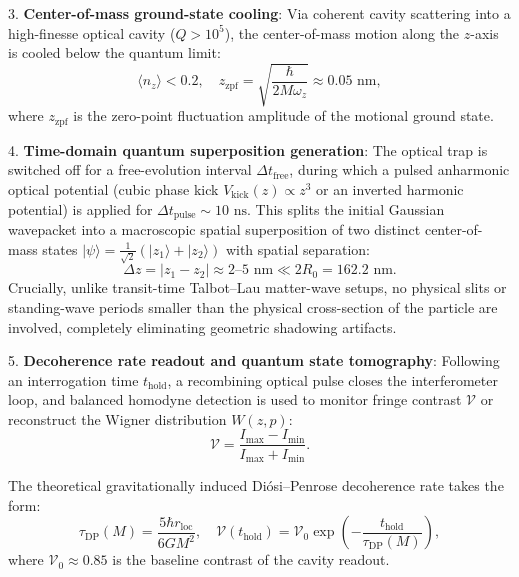 \documentclass[11pt,a4paper]{article}
\theoremstyle{definition}
\begin{document}
3. \textbf{Center-of-mass ground-state cooling}: Via coherent cavity scattering into a high-finesse optical cavity ($Q > 10^5$), the center-of-mass motion along the $z$-axis is cooled below the quantum limit:
\begin{equation}\label{eq:5.47}\tag{5.47}
\langle n_z \rangle < 0.2, \quad z_{\text{zpf}} = \sqrt{\frac{\hbar}{2 M \omega_z}} \approx 0.05\text{ nm},
\end{equation}
where $z_{\text{zpf}}$ is the zero-point fluctuation amplitude of the motional ground state.

4. \textbf{Time-domain quantum superposition generation}: The optical trap is switched off for a free-evolution interval $\Delta t_{\text{free}}$, during which a pulsed anharmonic optical potential (cubic phase kick $V_{\text{kick}}(z) \propto z^3$ or an inverted harmonic potential) is applied for $\Delta t_{\text{pulse}} \sim 10\text{ ns}$. This splits the initial Gaussian wavepacket into a macroscopic spatial superposition of two distinct center-of-mass states $|\psi\rangle = \frac{1}{\sqrt{2}}(|z_1\rangle + |z_2\rangle)$ with spatial separation:
\begin{equation}\label{eq:5.48}\tag{5.48}
\Delta z = |z_1 - z_2| \approx 2\text{--}5\text{ nm} \ll 2 R_0 = 162.2\text{ nm}.
\end{equation}
Crucially, unlike transit-time Talbot--Lau matter-wave setups, no physical slits or standing-wave periods smaller than the physical cross-section of the particle are involved, completely eliminating geometric shadowing artifacts.

5. \textbf{Decoherence rate readout and quantum state tomography}: Following an interrogation time $t_{\text{hold}}$, a recombining optical pulse closes the interferometer loop, and balanced homodyne detection is used to monitor fringe contrast $\mathcal{V}$ or reconstruct the Wigner distribution $W(z, p)$:
\begin{equation}\label{eq:5.49}\tag{5.49}
\mathcal{V} = \frac{I_{\text{max}} - I_{\text{min}}}{I_{\text{max}} + I_{\text{min}}}.
\end{equation}

The theoretical gravitationally induced Diósi--Penrose decoherence rate takes the form:
\begin{equation}\label{eq:5.50}\tag{5.50}
\tau_{\text{DP}}(M) = \frac{5 \hbar r_{\text{loc}}}{6 G M^2}, \quad \mathcal{V}(t_{\text{hold}}) = \mathcal{V}_0 \exp\left( - \frac{t_{\text{hold}}}{\tau_{\text{DP}}(M)} \right),
\end{equation}
where $\mathcal{V}_0 \approx 0.85$ is the baseline contrast of the cavity readout.
\end{document}
